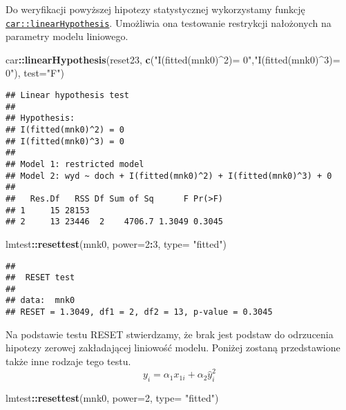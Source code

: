 \documentclass[polish,]{book}
\newenvironment{Shaded}{\begin{snugshade}}{\end{snugshade}}
\newcommand{\DataTypeTok}[1]{\textcolor[rgb]{0.13,0.29,0.53}{#1}}
\newcommand{\DecValTok}[1]{\textcolor[rgb]{0.00,0.00,0.81}{#1}}
\newcommand{\KeywordTok}[1]{\textcolor[rgb]{0.13,0.29,0.53}{\textbf{#1}}}
\newcommand{\NormalTok}[1]{#1}
\newcommand{\OperatorTok}[1]{\textcolor[rgb]{0.81,0.36,0.00}{\textbf{#1}}}
\newcommand{\StringTok}[1]{\textcolor[rgb]{0.31,0.60,0.02}{#1}}
\begin{document}
Do weryfikacji powyższej hipotezy statystycznej wykorzystamy funkcję \href{https://rdrr.io/cran/car/man/linearHypothesis.html}{\texttt{car::linearHypothesis}}. Umożliwia ona testowanie restrykcji nałożonych na
parametry modelu liniowego.

\begin{Shaded}
\begin{Highlighting}[]
\NormalTok{car}\OperatorTok{::}\KeywordTok{linearHypothesis}\NormalTok{(reset23,}
                 \KeywordTok{c}\NormalTok{(}\StringTok{"I(fitted(mnk0)^2)= 0"}\NormalTok{,}\StringTok{"I(fitted(mnk0)^3)= 0"}\NormalTok{), }\DataTypeTok{test=}\StringTok{"F"}\NormalTok{)}
\end{Highlighting}
\end{Shaded}

\begin{verbatim}
## Linear hypothesis test
## 
## Hypothesis:
## I(fitted(mnk0)^2) = 0
## I(fitted(mnk0)^3) = 0
## 
## Model 1: restricted model
## Model 2: wyd ~ doch + I(fitted(mnk0)^2) + I(fitted(mnk0)^3) + 0
## 
##   Res.Df   RSS Df Sum of Sq      F Pr(>F)
## 1     15 28153                           
## 2     13 23446  2    4706.7 1.3049 0.3045
\end{verbatim}

\begin{Shaded}
\begin{Highlighting}[]
\NormalTok{lmtest}\OperatorTok{::}\KeywordTok{resettest}\NormalTok{(mnk0, }\DataTypeTok{power=}\DecValTok{2}\OperatorTok{:}\DecValTok{3}\NormalTok{, }\DataTypeTok{type=} \StringTok{"fitted"}\NormalTok{)}
\end{Highlighting}
\end{Shaded}

\begin{verbatim}
## 
##  RESET test
## 
## data:  mnk0
## RESET = 1.3049, df1 = 2, df2 = 13, p-value = 0.3045
\end{verbatim}

Na podstawie testu RESET stwierdzamy, że brak jest podstaw do odrzucenia hipotezy zerowej zakładającej liniowość modelu. Poniżej zostaną przedstawione także
inne rodzaje tego testu.
\begin{equation}
y_i=\alpha_1x_{1i}+\alpha_2\hat{y}^2_i
\label{eq:wz137}
\end{equation}

\begin{Shaded}
\begin{Highlighting}[]
\NormalTok{lmtest}\OperatorTok{::}\KeywordTok{resettest}\NormalTok{(mnk0, }\DataTypeTok{power=}\DecValTok{2}\NormalTok{, }\DataTypeTok{type=} \StringTok{"fitted"}\NormalTok{)}
\end{Highlighting}
\end{Shaded}
\end{document}
